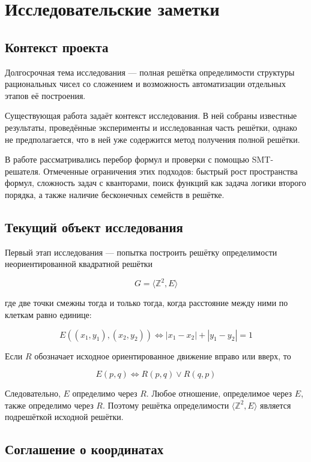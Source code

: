 \section{Исследовательские заметки}

\subsection{Контекст проекта}

Долгосрочная тема исследования --- полная решётка определимости структуры
рациональных чисел со сложением и возможность автоматизации отдельных этапов
её построения.

Существующая работа задаёт контекст исследования. В ней собраны известные
результаты, проведённые эксперименты и исследованная часть решётки, однако не
предполагается, что в ней уже содержится метод получения полной решётки.

В работе рассматривались перебор формул и проверки с помощью SMT-решателя.
Отмеченные ограничения этих подходов: быстрый рост пространства формул,
сложность задач с кванторами, поиск функций как задача логики второго порядка,
а также наличие бесконечных семейств в решётке.

\subsection{Текущий объект исследования}

Первый этап исследования --- попытка построить решётку определимости
неориентированной квадратной решётки


$$G=\langle\mathbb Z^2,E\rangle$$


где две точки смежны тогда и только тогда, когда расстояние между ними по
клеткам равно единице:

$$E((x_1,y_1),(x_2,y_2))\iff|x_1-x_2|+|y_1-y_2|=1$$

Если $R$ обозначает исходное ориентированное движение вправо или вверх, то

$$E(p,q)\iff R(p,q)\lor R(q,p)$$

Следовательно, $E$ определимо через $R$. Любое отношение, определимое через
$E$, также определимо через $R$. Поэтому решётка определимости
$\langle\mathbb Z^2,E\rangle$ является подрешёткой исходной решётки.

\subsection{Соглашение о координатах}

